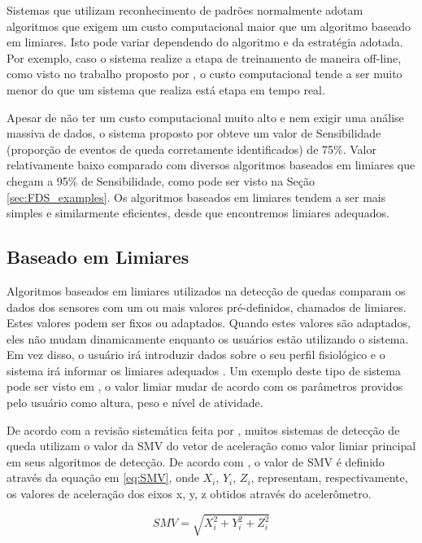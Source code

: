 Sistemas que utilizam reconhecimento de padrões normalmente adotam algoritmos que exigem um custo computacional maior que um algoritmo baseado em limiares. Isto pode variar dependendo do algoritmo e da estratégia adotada. Por exemplo, caso o sistema realize a etapa de treinamento de maneira off-line, como visto no trabalho proposto por \cite{zhao2012fallalarm}, o custo computacional tende a ser muito menor do que um sistema que realiza está etapa em tempo real. 

Apesar de não ter um custo computacional muito alto e nem exigir uma análise massiva de dados, o sistema proposto por \cite{zhao2012fallalarm} obteve um valor de Sensibilidade (proporção de eventos de queda corretamente identificados) de 75\%. Valor relativamente baixo comparado com diversos algoritmos baseados em limiares que chegam a 95\% de Sensibilidade, como pode ser visto na Seção \ref{sec:FDS_examples}. Os algoritmos baseados em limiares tendem a ser mais simples e similarmente eficientes, desde que encontremos limiares adequados.

\subsection{Baseado em Limiares}
Algoritmos baseados em limiares utilizados na detecção de quedas comparam os dados dos sensores com um ou mais valores pré-definidos, chamados de limiares. Estes valores podem ser fixos ou adaptados. Quando estes valores são adaptados, eles não mudam dinamicamente enquanto os usuários estão utilizando o sistema. Em vez disso, o usuário irá introduzir dados sobre o seu perfil fisiológico e o sistema irá informar os limiares adequados \citep{habib2014smartphone}. Um exemplo deste tipo de sistema pode ser visto em \cite{sposaro2009ifall}, o valor limiar mudar de acordo com os parâmetros providos pelo usuário como altura, peso e nível de atividade.

De acordo com a revisão sistemática feita por \cite{casilari2015analysis}, muitos sistemas de detecção de queda utilizam o valor da \ac{SMV} do vetor de aceleração como  valor limiar principal em seus algoritmos de detecção. De acordo com \cite{casilari2015analysis}, o valor de \ac{SMV} é definido através da equação em \ref{eq:SMV}, onde $X_i$, $Y_i$, $Z_i$, representam, respectivamente, os valores de aceleração dos eixos x, y, z obtidos através do acelerômetro.

\begin{equation}
SMV = \sqrt{X_i^2 + Y_i^2 + Z_i^2} 
\label{eq:SMV}
\end{equation}

